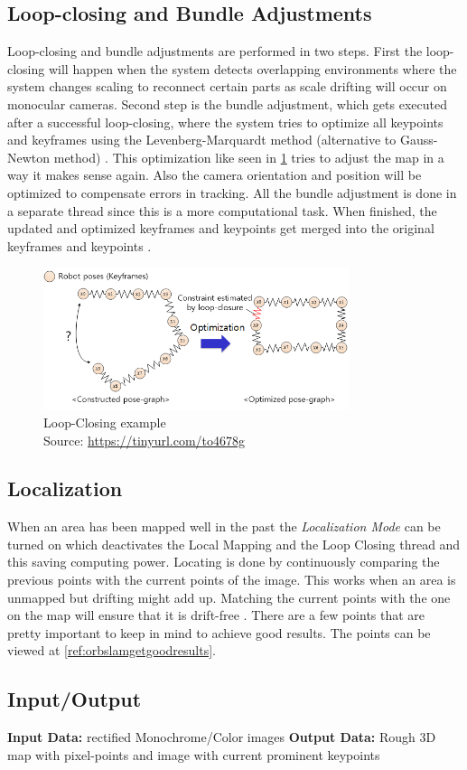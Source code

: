 \subsection{Loop-closing and Bundle Adjustments}
Loop-closing and bundle adjustments are performed in two steps. First the loop-closing will happen when the system detects overlapping environments where the system changes scaling to reconnect certain parts as scale drifting will occur on monocular cameras.\newline
Second step is the bundle adjustment, which gets executed after a successful loop-closing, where the system tries to optimize all keypoints and keyframes using the Levenberg-Marquardt method (alternative to Gauss-Newton method) \cite{LevenbergMarquardMethod}. This optimization like seen in \ref{img:loopclosing} tries to adjust the map in a way it makes sense again.  Also the camera orientation and position will be optimized to compensate errors in tracking. All the bundle adjustment is done in a separate thread since this is a more computational task.\newline
When finished, the updated and optimized keyframes and keypoints get merged into the original keyframes and keypoints \cite{orbslam2}.\newline
\begin{figure}[h!]
	\centering
	\includegraphics[width=0.8\textwidth]{./media/images/loopclosing.PNG}
  	\caption{Loop-Closing example
  	\\Source: \url{https://tinyurl.com/to4678g}}
  	\label{img:loopclosing}
\end{figure}

\subsection {Localization}
When an area has been mapped well in the past the \textit{Localization Mode} can be turned on which deactivates the Local Mapping and the Loop Closing thread and this saving computing power.
Locating is done by continuously comparing the previous points with the current points of the image. This works when an area is unmapped but drifting might add up.
Matching the current points with the one on the map will ensure that it is drift-free \cite{orbslam2}. There are a few points that are pretty important to keep in mind to achieve good results. The points can be viewed at \ref{ref:orbslamgetgoodresults}.

\subsection{Input/Output}
\textbf{Input Data:} rectified Monochrome/Color images\newline
\textbf{Output Data:} Rough 3D map with pixel-points and image with current prominent keypoints